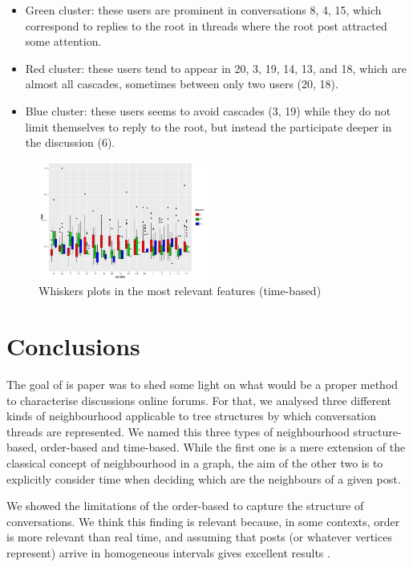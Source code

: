 \documentclass[conference]{IEEEtran}
\begin{document}
\begin{itemize}
\item Green cluster: these users are prominent  in conversations 8, 4, 15, which correspond to replies to the root in threads where the root post attracted some attention.

\item Red cluster: these users tend to appear in 20, 3, 19, 14, 13, and 18, which are almost all cascades, sometimes between only two users (20, 18).  

\item Blue cluster: these users seems to avoid cascades (3, 19) while they do not limit themselves to reply to the root, but instead the participate deeper in the discussion (6).
\end{itemize}

\begin{figure}
	\centering
	\includegraphics[width=0.5\textwidth]{cluster_whiskers}
	\caption{Whiskers plots in the most relevant features (time-based)}
	\label{fig:whiskers}
\end{figure}


\section{Conclusions}
The goal of is paper was to shed some light on what would be a proper method to characterise discussions online forums. For that, we analysed three different kinds of neighbourhood applicable to tree structures by which conversation threads are represented. We named this three types of neighbourhood structure-based, order-based and time-based. While the first one is a mere extension of the classical concept of neighbourhood in a graph, the aim of the other two is to explicitly consider time when deciding which are the neighbours of a given post.

We showed the limitations of the order-based to capture the structure of conversations. We think this finding is relevant because, in some contexts, order is more relevant than real time, and assuming that posts (or whatever vertices represent) arrive in homogeneous intervals gives excellent results \cite{Gomez2012}. 
\end{document}
